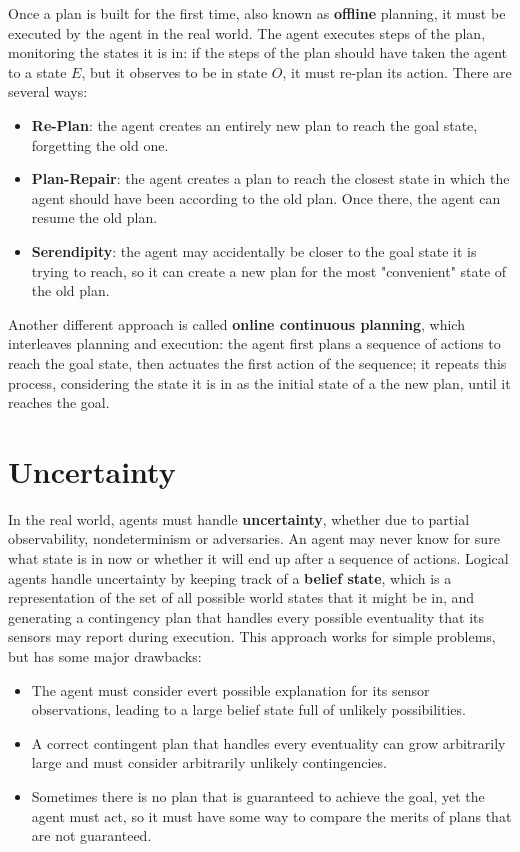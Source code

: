 \documentclass{article}
\begin{document}
Once a plan is built for the first time, also known as \textbf{offline} planning, it must be executed by the agent in the real world. The agent executes steps of the plan, monitoring the states it is in: if the steps of the plan should have taken the agent to a state $E$, but it observes to be in state $O$, it must re-plan its action. There are several ways:
\begin{itemize}
    \item \textbf{Re-Plan}: the agent creates an entirely new plan to reach the goal state, forgetting the old one.
    \item \textbf{Plan-Repair}: the agent creates a plan to reach the closest state in which the agent should have been according to the old plan. Once there, the agent can resume the old plan.
    \item \textbf{Serendipity}: the agent may accidentally be closer to the goal state it is trying to reach, so it can create a new plan for the most "convenient" state of the old plan.
\end{itemize}

Another different approach is called \textbf{online continuous planning}, which interleaves planning and execution: the agent first plans a sequence of actions to reach the goal state, then actuates the first action of the sequence; it repeats this process, considering the state it is in as the initial state of a the new plan, until it reaches the goal.

\clearpage
\section{Uncertainty}
In the real world, agents must handle \textbf{uncertainty}, whether due to partial observability, nondeterminism or adversaries. An agent may never know for sure what state is in now or whether it will end up after a sequence of actions. Logical agents handle uncertainty by keeping track of a \textbf{belief state}, which is a representation of the set of all possible world states that it might be in, and generating a contingency plan that handles every possible eventuality that its sensors may report during execution. This approach works for simple problems, but has some major drawbacks:
\begin{itemize}
    \item The agent must consider evert possible explanation for its sensor observations, leading to a large belief state full of unlikely possibilities.
    \item A correct contingent plan that handles every eventuality can grow arbitrarily large and must consider arbitrarily unlikely contingencies.
    \item Sometimes there is no plan that is guaranteed to achieve the goal, yet the agent must act, so it must have some way to compare the merits of plans that are not guaranteed.
\end{itemize}
\end{document}
